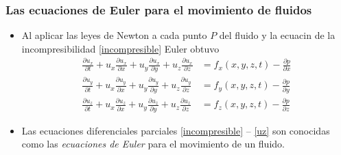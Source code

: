 \documentclass[serif,9pt]{beamer}
\begin{document}
\begin{frame}\frametitle{Las ecuaciones de Euler para el movimiento de fluidos} 
\begin{itemize}

\item  Al aplicar las leyes de Newton a cada punto $P$ del fluido y la ecuacin de la incompresibilidad \eqref{incompresible} Euler obtuvo \pause
\vspace{0.1cm}
\begin{align}
\frac{\partial u_x}{\partial t} + u_x\frac{\partial u_x}{\partial x} + u_y\frac{\partial u_x}{\partial y} + 
u_z\frac{\partial u_x}{\partial z} &= f_x(x,y,z,t) -  \frac{\partial p}{\partial x} \label{ux} \\
\frac{\partial u_y}{\partial t} + u_x\frac{\partial u_y}{\partial x} + u_y\frac{\partial u_y}{\partial y} + 
u_z\frac{\partial u_y}{\partial z} &= f_y(x,y,z,t) -  \frac{\partial p}{\partial y} \label{uy} \\
\frac{\partial u_z}{\partial t} + u_x\frac{\partial u_z}{\partial x} + u_y\frac{\partial u_z}{\partial y} + 
u_z\frac{\partial u_z}{\partial z} &= f_z(x,y,z,t) -  \frac{\partial p}{\partial z} \label{uz}
\end{align}\pause

\medskip
\item Las ecuaciones diferenciales parciales \eqref{incompresible} -- \eqref{uz} son conocidas como las \textit{ecuaciones de Euler} para el movimiento de un fluido.

\end{itemize}

\end{frame}

\end{document}
